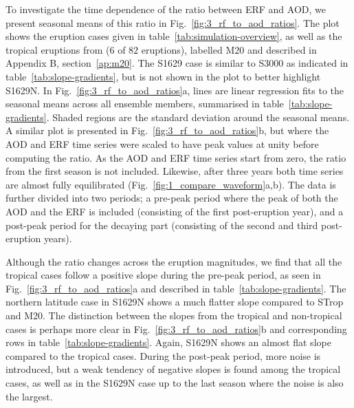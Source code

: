 \documentclass[draft]{agujournal2019}
\begin{document}
  To investigate the time dependence of the ratio between ERF and AOD, we present
  seasonal means of this ratio in Fig.~\ref{fig:3_rf_to_aod_ratios}. The plot shows the
  eruption cases given in table~\ref{tab:simulation-overview}, as well as the tropical
  eruptions from  (\(6\) of \(82\) eruptions), labelled M20
  and described in Appendix B, section~\ref{ap:m20}. The S1629 case is similar to S3000
  as indicated in table~\ref{tab:slope-gradients}, but is not shown in the plot to
  better highlight S1629N. In Fig.~\ref{fig:3_rf_to_aod_ratios}a, lines are linear
  regression fits to the seasonal means across all ensemble members, summarised in
  table~\ref{tab:slope-gradients}. Shaded regions are the standard deviation around the
  seasonal means. A similar plot is presented in Fig.~\ref{fig:3_rf_to_aod_ratios}b, but
  where the AOD and ERF time series were scaled to have peak values at unity before
  computing the ratio. As the AOD and ERF time series start from zero, the ratio from
  the first season is not included. Likewise, after three years both time series are
  almost fully equilibrated (Fig.~\ref{fig:1_compare_waveform}a,b). The data is further
  divided into two periods; a pre-peak period where the peak of both the AOD and the ERF
  is included (consisting of the first post-eruption year), and a post-peak period for
  the decaying part (consisting of the second and third post-eruption years).

  Although the ratio changes across the eruption magnitudes, we find that all the
  tropical cases follow a positive slope during the pre-peak period, as seen in
  Fig.~\ref{fig:3_rf_to_aod_ratios}a and described in table~\ref{tab:slope-gradients}.
  The northern latitude case in S1629N shows a much flatter slope compared to STrop and
  M20. The distinction between the slopes from the tropical and non-tropical cases is
  perhaps more clear in Fig.~\ref{fig:3_rf_to_aod_ratios}b and corresponding rows in
  table~\ref{tab:slope-gradients}. Again, S1629N shows an almost flat slope compared to
  the tropical cases. During the post-peak period, more noise is introduced, but a weak
  tendency of negative slopes is found among the tropical cases, as well as in the
  S1629N case up to the last season where the noise is also the largest.
\end{document}
